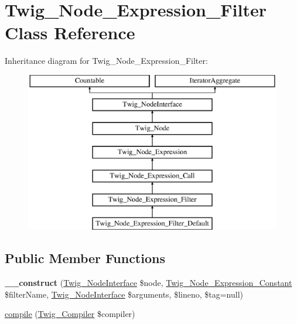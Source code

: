 \hypertarget{classTwig__Node__Expression__Filter}{}\section{Twig\+\_\+\+Node\+\_\+\+Expression\+\_\+\+Filter Class Reference}
\label{classTwig__Node__Expression__Filter}
Inheritance diagram for Twig\+\_\+\+Node\+\_\+\+Expression\+\_\+\+Filter\+:\begin{figure}[H]
\begin{center}
\leavevmode
\includegraphics[height=7.000000cm]{classTwig__Node__Expression__Filter}
\end{center}
\end{figure}
\subsection*{Public Member Functions}
\begin{DoxyCompactItemize}
\item 
{\bfseries \+\_\+\+\_\+construct} (\hyperlink{interfaceTwig__NodeInterface}{Twig\+\_\+\+Node\+Interface} \$node, \hyperlink{classTwig__Node__Expression__Constant}{Twig\+\_\+\+Node\+\_\+\+Expression\+\_\+\+Constant} \$filter\+Name, \hyperlink{interfaceTwig__NodeInterface}{Twig\+\_\+\+Node\+Interface} \$arguments, \$lineno, \$tag=null)\hypertarget{classTwig__Node__Expression__Filter_a530cb273117336dcf601ca7d2a9ad3bd}{}\label{classTwig__Node__Expression__Filter_a530cb273117336dcf601ca7d2a9ad3bd}

\item 
\hyperlink{classTwig__Node__Expression__Filter_a5358840b2bf6405c5d99ffa8b93e8f0d}{compile} (\hyperlink{classTwig__Compiler}{Twig\+\_\+\+Compiler} \$compiler)
\end{DoxyCompactItemize}
